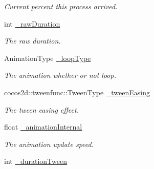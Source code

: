 \begin{DoxyCompactItemize}
\begin{DoxyCompactList}\small\item\em Current percent this process arrived. \end{DoxyCompactList}\item 
\mbox{\label{classcocostudio_1_1ProcessBase_a688687008a1b9809a6d37b0b65d030a0}} 
int \hyperlink{classcocostudio_1_1ProcessBase_a688687008a1b9809a6d37b0b65d030a0}{\+\_\+raw\+Duration}
\begin{DoxyCompactList}\small\item\em The raw duration. \end{DoxyCompactList}\item 
\mbox{\label{classcocostudio_1_1ProcessBase_a551910260a8a3e8301270b57b80f056c}} 
Animation\+Type \hyperlink{classcocostudio_1_1ProcessBase_a551910260a8a3e8301270b57b80f056c}{\+\_\+loop\+Type}
\begin{DoxyCompactList}\small\item\em The animation whether or not loop. \end{DoxyCompactList}\item 
\mbox{\label{classcocostudio_1_1ProcessBase_ab4be3fd15f7d8f928f333ac2bfdb9c85}} 
cocos2d\+::tweenfunc\+::\+Tween\+Type \hyperlink{classcocostudio_1_1ProcessBase_ab4be3fd15f7d8f928f333ac2bfdb9c85}{\+\_\+tween\+Easing}
\begin{DoxyCompactList}\small\item\em The tween easing effect. \end{DoxyCompactList}\item 
\mbox{\label{classcocostudio_1_1ProcessBase_adeac12c52cac070237923ac36b06ea87}} 
float \hyperlink{classcocostudio_1_1ProcessBase_adeac12c52cac070237923ac36b06ea87}{\+\_\+animation\+Internal}
\begin{DoxyCompactList}\small\item\em The animation update speed. \end{DoxyCompactList}\item 
\mbox{\label{classcocostudio_1_1ProcessBase_af186ec831e4f16d178a31033104afa6b}} 
int \hyperlink{classcocostudio_1_1ProcessBase_af186ec831e4f16d178a31033104afa6b}{\+\_\+duration\+Tween}

\end{DoxyCompactItemize}
